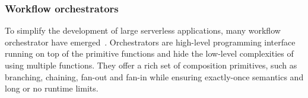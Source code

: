 



\subsubsection{Workflow orchestrators}


To simplify the development of large serverless applications, many workflow orchestrator have emerged~\cite{excamera, gg-atc, aws-step-functions,
	google-cloud-composer, google-workflows, durable-functions}. Orchestrators  are  high-level programming interface running on top of the primitive functions and hide the low-level complexities of using multiple functions. They offer a  rich set of composition primitives, such as
branching, chaining, fan-out and fan-in while ensuring exactly-once semantics and long or no runtime limits.

